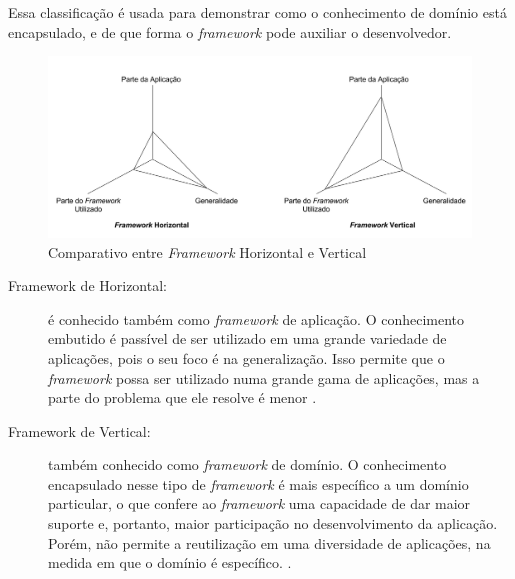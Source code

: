 Essa classificação é usada para demonstrar como o conhecimento de domínio está encapsulado, e de que forma o \textit{framework} pode auxiliar o desenvolvedor.
\begin{figure}[h]
    \centering
    \includegraphics[width=\textwidth]{figuras/frameworkhorizontalvertical.png}
    \caption{Comparativo entre \textit{Framework} Horizontal e Vertical}
    \label{fig:frameworkhorizontalvertical}
  \end{figure}
\par
\begin{description}
\item[Framework de Horizontal:] é conhecido também como \textit{framework} de aplicação. O conhecimento embutido é passível de ser utilizado em uma grande variedade de aplicações, pois o seu foco é na generalização. Isso permite que o \textit{framework} possa ser utilizado numa grande gama de aplicações, mas a parte do problema que ele resolve é menor \cite{barretoJunior2006}.
\item[Framework de Vertical:] também conhecido como \textit{framework} de domínio. O conhecimento encapsulado nesse tipo de \textit{framework} é mais específico a um domínio particular, o que confere ao \textit{framework} uma capacidade de dar maior suporte e, portanto, maior participação no desenvolvimento da aplicação. Porém, não permite a reutilização em uma diversidade de aplicações, na medida em que o domínio é específico. \cite{barretoJunior2006}.
\end{description}


